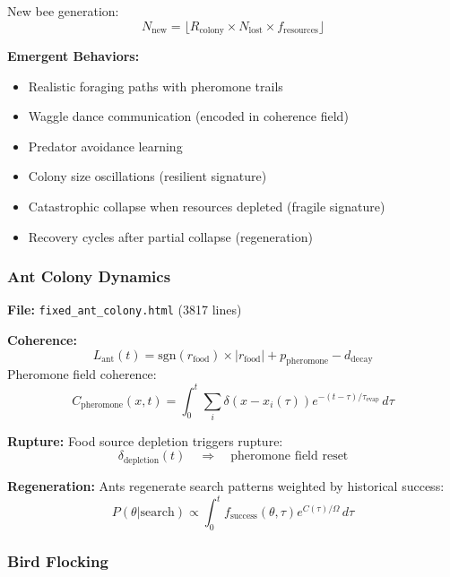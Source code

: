 \documentclass[11pt,a4paper]{article}
\theoremstyle{definition}
\theoremstyle{remark}
\begin{document}
New bee generation:
\begin{equation}
N_{\text{new}} = \lfloor R_{\text{colony}} \times N_{\text{lost}} \times f_{\text{resources}} \rfloor
\end{equation}

\textbf{Emergent Behaviors:}
\begin{itemize}
\item Realistic foraging paths with pheromone trails
\item Waggle dance communication (encoded in coherence field)
\item Predator avoidance learning
\item Colony size oscillations (resilient signature)
\item Catastrophic collapse when resources depleted (fragile signature)
\item Recovery cycles after partial collapse (regeneration)
\end{itemize}

\subsubsection{Ant Colony Dynamics}

\textbf{File:} \texttt{fixed\_ant\_colony.html} (3817 lines)

\textbf{Coherence:}
\begin{equation}
L_{\text{ant}}(t) = \text{sgn}(r_{\text{food}}) \times |r_{\text{food}}| + p_{\text{pheromone}} - d_{\text{decay}}
\end{equation}
Pheromone field coherence:
\begin{equation}
C_{\text{pheromone}}(x,t) = \int_0^t \sum_{i} \delta(x - x_i(\tau)) e^{-(t-\tau)/\tau_{\text{evap}}}\,d\tau
\end{equation}

\textbf{Rupture:} Food source depletion triggers rupture:
\begin{equation}
\delta_{\text{depletion}}(t) \quad \Rightarrow \quad \text{pheromone field reset}
\end{equation}

\textbf{Regeneration:} Ants regenerate search patterns weighted by historical success:
\begin{equation}
P(\theta|\text{search}) \propto \int_0^t f_{\text{success}}(\theta,\tau) e^{C(\tau)/\Omega}\,d\tau
\end{equation}

\subsubsection{Bird Flocking}
\end{document}
